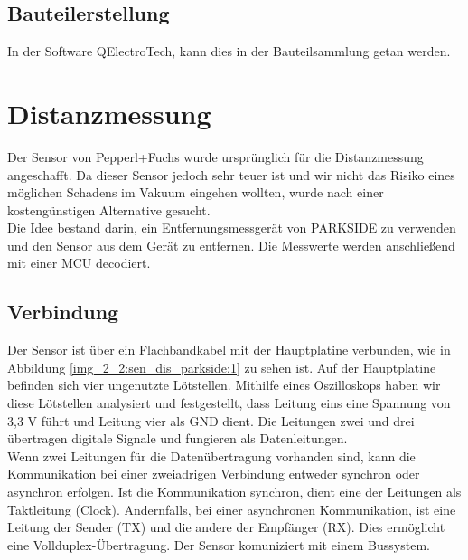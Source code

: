 \newpage

\subsection{Bauteilerstellung}

In der Software QElectroTech, kann dies in der Bauteilsammlung getan werden.


\section{Distanzmessung}

Der Sensor von Pepperl+Fuchs wurde ursprünglich für die Distanzmessung angeschafft. Da dieser Sensor jedoch sehr teuer ist und wir nicht das Risiko eines möglichen Schadens im Vakuum eingehen wollten, wurde nach einer kostengünstigen Alternative gesucht.\\
Die Idee bestand darin, ein Entfernungsmessgerät von PARKSIDE zu verwenden und den Sensor aus dem Gerät zu entfernen. Die Messwerte werden anschließend mit einer MCU decodiert.

\subsection{Verbindung}
Der Sensor ist über ein Flachbandkabel mit der Hauptplatine verbunden, wie in Abbildung \ref{img_2_2:sen_dis_parkside:1} zu sehen ist. Auf der Hauptplatine befinden sich vier ungenutzte Lötstellen. Mithilfe eines Oszilloskops haben wir diese Lötstellen analysiert und festgestellt, dass Leitung eins eine Spannung von 3,3 V führt und Leitung vier als GND dient. Die Leitungen zwei und drei übertragen digitale Signale und fungieren als Datenleitungen.\\
Wenn zwei Leitungen für die Datenübertragung vorhanden sind, kann die Kommunikation bei einer zweiadrigen Verbindung entweder synchron oder asynchron erfolgen. Ist die Kommunikation synchron, dient eine der Leitungen als Taktleitung (Clock). Andernfalls, bei einer asynchronen Kommunikation, ist eine Leitung der Sender (TX) und die andere der Empfänger (RX). Dies ermöglicht eine Vollduplex-Übertragung.
Der Sensor komuniziert mit einem Bussystem.




